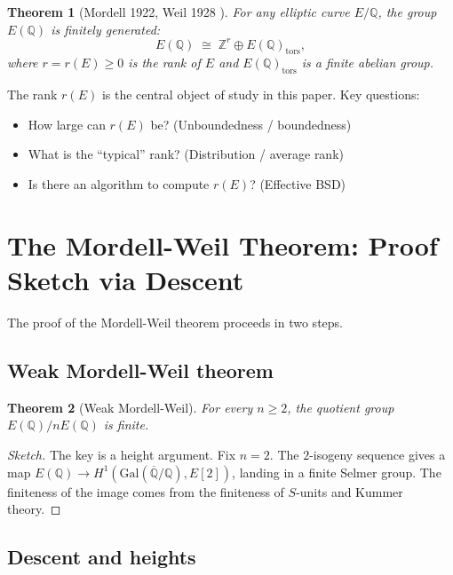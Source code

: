 \documentclass[12pt,a4paper]{amsart}
\newtheorem{theorem}{Theorem}[section]
\theoremstyle{definition}
\theoremstyle{remark}
\newcommand{\Z}{\mathbb{Z}}
\newcommand{\Q}{\mathbb{Q}}
\newcommand{\Gal}{\mathrm{Gal}}
\newcommand{\Qbar}{\overline{\Q}}
\begin{document}
\begin{theorem}[Mordell 1922, Weil 1928 \cite{Mordell1922,Weil1928}]
  For any elliptic curve $E/\Q$, the group $E(\Q)$ is finitely generated:
  \[
    E(\Q) \;\cong\; \Z^r \oplus E(\Q)_{\mathrm{tors}},
  \]
  where $r = r(E) \geq 0$ is the \emph{rank} of $E$ and $E(\Q)_{\mathrm{tors}}$ is a
  finite abelian group.
\end{theorem}

The rank $r(E)$ is the central object of study in this paper. Key questions:
\begin{itemize}
  \item How large can $r(E)$ be? (Unboundedness / boundedness)
  \item What is the ``typical'' rank? (Distribution / average rank)
  \item Is there an algorithm to compute $r(E)$? (Effective BSD)
\end{itemize}

\section{The Mordell-Weil Theorem: Proof Sketch via Descent}\label{sec:mordell_weil}

The proof of the Mordell-Weil theorem proceeds in two steps.

\subsection{Weak Mordell-Weil theorem}

\begin{theorem}[Weak Mordell-Weil]
  For every $n \geq 2$, the quotient group $E(\Q)/nE(\Q)$ is finite.
\end{theorem}

\begin{proof}[Sketch]
  The key is a height argument. Fix $n=2$. The $2$-isogeny sequence gives a map
  $E(\Q) \to H^1(\Gal(\Qbar/\Q), E[2])$, landing in a finite Selmer group.
  The finiteness of the image comes from the finiteness of $S$-units and Kummer theory.
\end{proof}

\subsection{Descent and heights}
\end{document}
